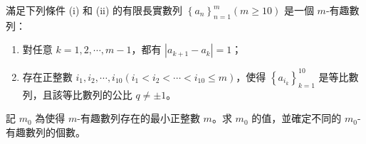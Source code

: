 滿足下列條件 (i) 和 (ii) 的有限長實數列 $\left\{a_n\right\}_{n=1}^{m}\left(m\geq10\right)$ 是一個 $m$-有趣數列：
\begin{enumerate}[label = (\roman*)]
  \item 對任意 $k=1,2,\cdots,m-1$，都有 $\left|a_{k+1}-a_k\right|=1$；
  \item 存在正整數 $i_1,i_2,\cdots,i_{10}\left(i_1<i_2<\cdots<i_{10}\leq m\right)$，使得 $\left\{a_{i_k}\right\}_{k=1}^{10}$ 是等比數列，且該等比數列的公比 $q\neq\pm1$。
\end{enumerate}
記 $m_0$ 為使得 $m$-有趣數列存在的最小正整數 $m$。求 $m_0$ 的值，並確定不同的 $m_0$-有趣數列的個數。